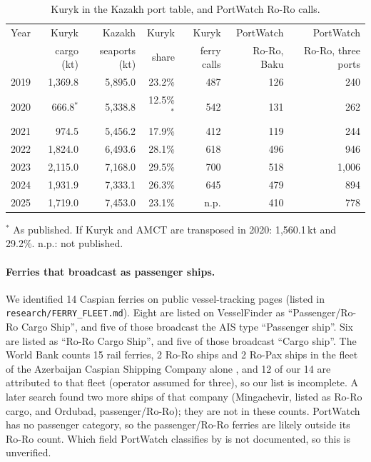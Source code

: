 \documentclass[11pt,a4paper]{article}
\begin{document}
\begin{table}[tbp]
\centering\small
\caption{Kuryk in the Kazakh port table, and PortWatch Ro-Ro calls.}
\label{tab:kuryk}
\begin{tabular}{lrrrrrr}
\toprule
Year & Kuryk & Kazakh & Kuryk & Kuryk & PortWatch & PortWatch \\
 & cargo (kt) & seaports (kt) & share & ferry calls & Ro-Ro, Baku & Ro-Ro, three ports \\
\midrule
2019 & 1,369.8 & 5,895.0 & 23.2\% & 487 & 126 & 240 \\
2020 & 666.8$^{*}$ & 5,338.8 & 12.5\%$^{*}$ & 542 & 131 & 262 \\
2021 & 974.5 & 5,456.2 & 17.9\% & 412 & 119 & 244 \\
2022 & 1,824.0 & 6,493.6 & 28.1\% & 618 & 496 & 946 \\
2023 & 2,115.0 & 7,168.0 & 29.5\% & 700 & 518 & 1,006 \\
2024 & 1,931.9 & 7,333.1 & 26.3\% & 645 & 479 & 894 \\
2025 & 1,719.0 & 7,453.0 & 23.1\% & n.p. & 410 & 778 \\
\bottomrule
\end{tabular}

\smallskip
\footnotesize $^{*}$ As published. If Kuryk and AMCT are transposed in 2020: 1,560.1\,kt and 29.2\%. n.p.: not published.
\end{table}

\paragraph{Ferries that broadcast as passenger ships.} We identified 14 Caspian ferries on public vessel-tracking pages (listed in \texttt{research/FERRY\_FLEET.md}). Eight are listed on VesselFinder as ``Passenger/Ro-Ro Cargo Ship'', and five of those broadcast the AIS type ``Passenger ship''. Six are listed as ``Ro-Ro Cargo Ship'', and five of those broadcast ``Cargo ship''. The World Bank counts 15 rail ferries, 2 Ro-Ro ships and 2 Ro-Pax ships in the fleet of the Azerbaijan Caspian Shipping Company alone \cite{worldbank2023middle}, and 12 of our 14 are attributed to that fleet (operator assumed for three), so our list is incomplete. A later search found two more ships of that company (Mingachevir, listed as Ro-Ro cargo, and Ordubad, passenger/Ro-Ro); they are not in these counts. PortWatch has no passenger category, so the passenger/Ro-Ro ferries are likely outside its Ro-Ro count. Which field PortWatch classifies by is not documented, so this is unverified.
\end{document}
